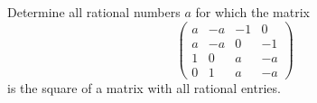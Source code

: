Determine all rational numbers \(a\) for which the matrix
\[\begin{pmatrix}
    a       & -a & -1 & 0 \\
    a       & -a & 0 & -1 \\
    1  & 0 & a & -a\\
    0      & 1 & a &  -a
\end{pmatrix}\]is the square of a matrix with all rational entries.

